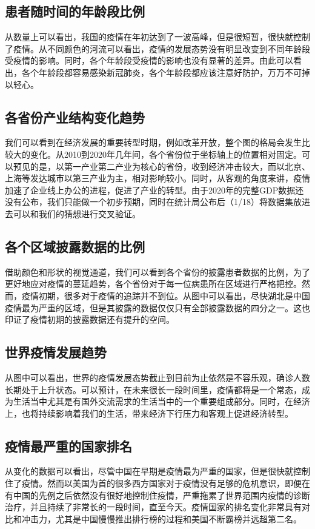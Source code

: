 \documentclass{ctexart}
\begin{document}
\subsection{患者随时间的年龄段比例}
从数量上可以看出，我国的疫情在年初达到了一波高峰，但是很短暂，很快就控制了疫情。从不同颜色的河流可以看出，疫情的发展态势没有明显改变到不同年龄段受疫情的影响。同时，各个年龄段受疫情的影响也没有显著的差异。由此可以看出，各个年龄段都容易感染新冠肺炎，各个年龄段都应该注意好防护，万万不可掉以轻心。
\subsection{各省份产业结构变化趋势}
我们可以看到在经济发展的重要转型时期，例如改革开放，整个图的格局会发生比较大的变化。从2010到2020年几年间，各个省份位于坐标轴上的位置相对固定。可以预见的是，以第一产业第二产业为核心的省份，收到经济冲击较大，而以北京、上海等发达城市以第三产业为主，相对影响较小。同时，从客观的角度来讲，疫情加速了企业线上办公的进程，促进了产业的转型。由于2020年的完整GDP数据还没有公布，我们只能做一个初步预期，同时在统计局公布后（1/18）将数据集放进去可以和我们的猜想进行交叉验证。
\subsection{各个区域披露数据的比例}
借助颜色和形状的视觉通道，我们可以看到各个省份的披露患者数据的比例，为了更好地应对疫情的蔓延趋势，各个省份对于每一位病患所在区域进行严格把控。然而，疫情初期，很多对于疫情的追踪并不到位。从图中可以看出，尽快湖北是中国疫情最为严重的区域，但是其披露的数据仅仅只有全部披露数据的四分之一。这也印证了疫情初期的披露数据还有提升的空间。
\subsection{世界疫情发展趋势}
从图中可以看出，世界的疫情发展态势截止到目前为止依然是不容乐观，确诊人数长期处于上升状态。可以预计，在未来很长一段时间里，疫情都将是一个常态，成为生活当中尤其是有国外交流需求的生活当中的一个重要组成部分。同时，在经济上，也将持续影响着我们的生活，带来经济下行压力和客观上促进经济转型。
\subsection{疫情最严重的国家排名}
从变化的数据可以看出，尽管中国在早期是疫情最为严重的国家，但是很快就控制住了疫情。然而以美国为首的很多西方国家对于疫情没有足够的危机意识，即便在有中国的先例之后依然没有很好地控制住疫情，严重拖累了世界范围内疫情的诊断治疗，并且持续了非常长的一段时间，直至今天。疫情国家的排名变化非常具有对比和冲击力，尤其是中国慢慢推出排行榜的过程和美国不断霸榜并远超第二名。
\end{document}
